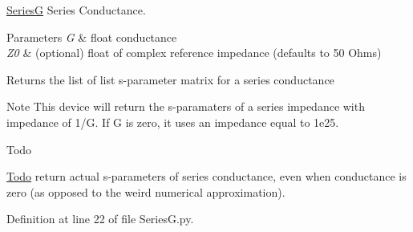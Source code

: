 \hyperlink{namespaceSignalIntegrity_1_1Devices_1_1SeriesG}{SeriesG} Series Conductance. 


\begin{DoxyParams}{Parameters}
{\em G} & float conductance \\
\hline
{\em Z0} & (optional) float of complex reference impedance (defaults to 50 Ohms) \\
\hline
\end{DoxyParams}
\begin{DoxyReturn}{Returns}
the list of list s-\/parameter matrix for a series conductance 
\end{DoxyReturn}
\begin{DoxyNote}{Note}
This device will return the s-\/paramaters of a series impedance with impedance of 1/G. If G is zero, it uses an impedance equal to 1e25. 
\end{DoxyNote}
\begin{DoxyRefDesc}{Todo}
\item[\hyperlink{todo__todo000003}{Todo}]return actual s-\/parameters of series conductance, even when conductance is zero (as opposed to the weird numerical approximation). \end{DoxyRefDesc}


Definition at line 22 of file Series\+G.\+py.

